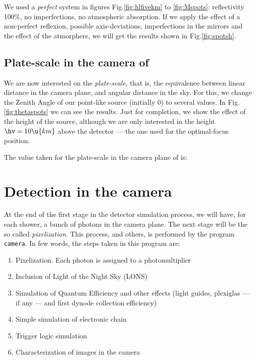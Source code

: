 \afterpage{\clearpage}

We used a \emph{perfect} system in figures Fig.\ref{fig:hlfivekm}
to \ref{fig:Mspots}: reflectivity 100\%, no imperfections, no
atmospheric absorption. If we apply the effect of a non-perfect
reflexion, possible axis-deviations, imperfections in the mirrors and
the effect of the atmorphere, we will get the results shown in
Fig.\ref{fig:spotsh}.

\subsection{Plate-scale in the camera of \MAGIC}

We are now interested on the \emph{plate-scale}, that is, the
equivalence between linear distance in the camera plane, and angular
distance in the sky. For this, we change the Zenith Angle of our
point-like source (initially 0\deg) to several values. In
Fig.\ref{fig:thetaspots} we can see the results. Just for completion, we
show the effect of the height of the source, although we are only
interested in the height $\hv=10\u{km}$ above the detector --- the one
used for the optimal-focus position.

The value taken for the plate-scale in the camera plane of \MAGIC is:
%
\platescaleeq

\section{Detection in the camera}

At the end of the first stage in the detector simulation process, we
will have, for each shower, a bunch of photons in the camera plane.
The next stage will be the so called \emph{pixelization}.  This
process, and others, is performed by the program \texttt{camera}. In
few words, the steps taken in this program are:

\begin{enumerate}
\item Pixelization. Each photon is assigned to a photomultiplier

\item Inclusion of Light of the Night Sky (LONS)
  
\item Simulation of Quantum Efficiency and other effects (light
  guides, plexiglas --- if any --- and first dynode collection
  efficiency)

\item Simple simulation of electronic chain

\item Trigger logic simulation

\item Characterization of images in the camera
\end{enumerate}

